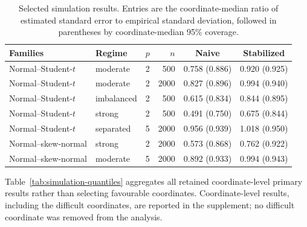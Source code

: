 \begin{table}[t]
\centering
\small
\caption{Selected simulation results. Entries are the coordinate-median ratio
of estimated standard error to empirical standard deviation, followed in
parentheses by coordinate-median 95\% coverage.}
\label{tab:simulation-main}
\begin{tabular}{llrrcc}
\toprule
Families & Regime & $p$ & $n$ & Naive & Stabilized \\
\midrule
Normal--Student-$t$ & moderate & 2 & 500  & 0.758 (0.886) & 0.920 (0.925) \\
Normal--Student-$t$ & moderate & 2 & 2000 & 0.827 (0.896) & 0.994 (0.940) \\
Normal--Student-$t$ & imbalanced & 2 & 500 & 0.615 (0.834) & 0.844 (0.895) \\
Normal--Student-$t$ & strong & 2 & 500 & 0.491 (0.750) & 0.675 (0.844) \\
Normal--Student-$t$ & separated & 5 & 2000 & 0.956 (0.939) & 1.018 (0.950) \\
Normal--skew-normal & strong & 2 & 2000 & 0.573 (0.868) & 0.762 (0.922) \\
Normal--skew-normal & moderate & 5 & 2000 & 0.892 (0.933) & 0.994 (0.943) \\
\bottomrule
\end{tabular}
\end{table}

Table~\ref{tab:simulation-quantiles} aggregates all retained coordinate-level
primary results rather than selecting favourable coordinates.  Coordinate-level
results, including the difficult coordinates, are reported in the supplement;
no difficult coordinate was removed from the analysis.

\begin{table}[t]
\centering
\small
\caption{Across-coordinate distribution of calibration results in the primary
study.  Entries are the 25th percentile, median, and 75th percentile across all
scenario--sample-size--coordinate cells; corrected results use the central
bandwidth.}
\label{tab:simulation-quantiles}
\end{table}

